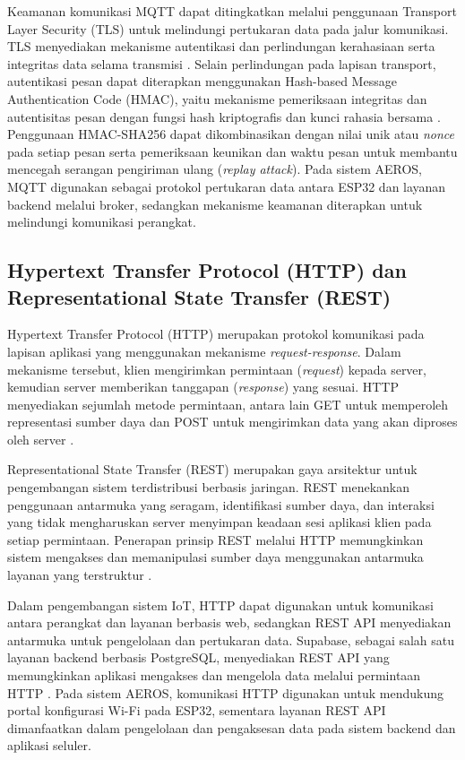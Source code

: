 Keamanan komunikasi MQTT dapat ditingkatkan melalui penggunaan Transport Layer Security (TLS) untuk melindungi pertukaran data pada jalur komunikasi. TLS menyediakan mekanisme autentikasi dan perlindungan kerahasiaan serta integritas data selama transmisi \cite{tls_standard}. Selain perlindungan pada lapisan transport, autentikasi pesan dapat diterapkan menggunakan Hash-based Message Authentication Code (HMAC), yaitu mekanisme pemeriksaan integritas dan autentisitas pesan dengan fungsi hash kriptografis dan kunci rahasia bersama \cite{hmac_rfc}. Penggunaan HMAC-SHA256 dapat dikombinasikan dengan nilai unik atau \textit{nonce} pada setiap pesan serta pemeriksaan keunikan dan waktu pesan untuk membantu mencegah serangan pengiriman ulang (\textit{replay attack}). Pada sistem AEROS, MQTT digunakan sebagai protokol pertukaran data antara ESP32 dan layanan backend melalui broker, sedangkan mekanisme keamanan diterapkan untuk melindungi komunikasi perangkat.

\subsection{Hypertext Transfer Protocol (HTTP) dan Representational State Transfer (REST)}

Hypertext Transfer Protocol (HTTP) merupakan protokol komunikasi pada lapisan aplikasi yang menggunakan mekanisme \textit{request-response}. Dalam mekanisme tersebut, klien mengirimkan permintaan (\textit{request}) kepada server, kemudian server memberikan tanggapan (\textit{response}) yang sesuai. HTTP menyediakan sejumlah metode permintaan, antara lain GET untuk memperoleh representasi sumber daya dan POST untuk mengirimkan data yang akan diproses oleh server \cite{http_rfc}.

Representational State Transfer (REST) merupakan gaya arsitektur untuk pengembangan sistem terdistribusi berbasis jaringan. REST menekankan penggunaan antarmuka yang seragam, identifikasi sumber daya, dan interaksi yang tidak mengharuskan server menyimpan keadaan sesi aplikasi klien pada setiap permintaan. Penerapan prinsip REST melalui HTTP memungkinkan sistem mengakses dan memanipulasi sumber daya menggunakan antarmuka layanan yang terstruktur \cite{fielding_rest}.

Dalam pengembangan sistem IoT, HTTP dapat digunakan untuk komunikasi antara perangkat dan layanan berbasis web, sedangkan REST API menyediakan antarmuka untuk pengelolaan dan pertukaran data. Supabase, sebagai salah satu layanan backend berbasis PostgreSQL, menyediakan REST API yang memungkinkan aplikasi mengakses dan mengelola data melalui permintaan HTTP \cite{supabase_rest}. Pada sistem AEROS, komunikasi HTTP digunakan untuk mendukung portal konfigurasi Wi-Fi pada ESP32, sementara layanan REST API dimanfaatkan dalam pengelolaan dan pengaksesan data pada sistem backend dan aplikasi seluler.




